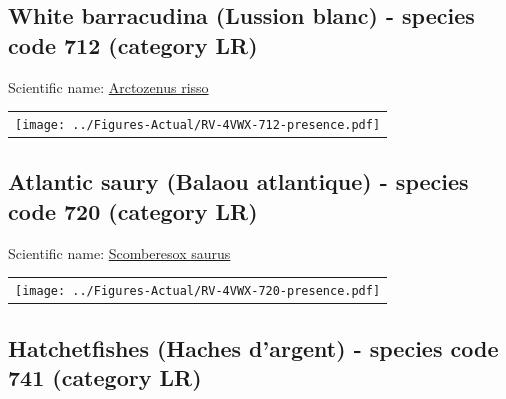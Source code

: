 \documentclass[12pt]{article}\usepackage[]{graphicx}\usepackage[]{color}
\begin{document}
\hypertarget{sec:712}{%
\subsection{White barracudina (Lussion blanc) - species code 712 (category LR)}\label{sec:712}}

  


Scientific name: \href{http://www.marinespecies.org/aphia.php?p=taxdetails\&id=126352}{Arctozenus risso} \newline
\begin{minipage}{1.0\textwidth}
 \begin{tabular}{c}
\texttt{[image: ../Figures-Actual/RV-4VWX-712-presence.pdf]} \\ 
\end{tabular} 
\end{minipage}
\clearpage

\renewcommand\thefigure{\thesubsection\Alph{figure}}

\setcounter{figure}{0}

\hypertarget{sec:720}{%
\subsection{Atlantic saury (Balaou atlantique) - species code 720 (category LR)}\label{sec:720}}

  


Scientific name: \href{http://www.marinespecies.org/aphia.php?p=taxdetails\&id=126392}{Scomberesox saurus} \newline
\begin{minipage}{1.0\textwidth}
 \begin{tabular}{c}
\texttt{[image: ../Figures-Actual/RV-4VWX-720-presence.pdf]} \\ 
\end{tabular} 
\end{minipage}
\clearpage

\renewcommand\thefigure{\thesubsection\Alph{figure}}

\setcounter{figure}{0}

\hypertarget{sec:741}{%
\subsection{Hatchetfishes (Haches d'argent) - species code 741 (category LR)}\label{sec:741}}
\end{document}
